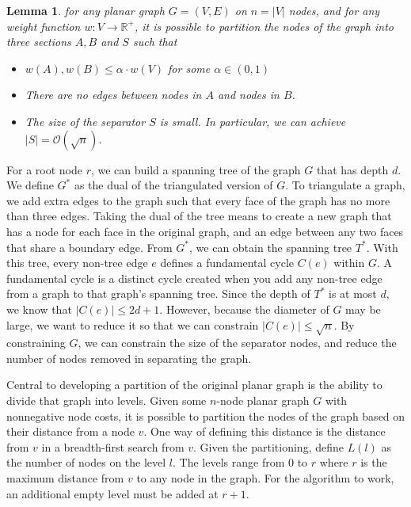 \documentclass[11pt]{article}
\newtheorem{lemma}[theorem]{Lemma}
\begin{document}
\begin{lemma}
    \label{lemma:separator}
    for any planar graph $G = (V,E)$ on $n = |V|$ nodes, and for any weight function $w: V \rightarrow \mathbb{R}^+$, it is possible to partition the nodes of the graph into three sections $A, B$ and $S$ such that
    \begin{itemize}
        \item $w(A), w(B) \leq \alpha \cdot w(V)$ for some $\alpha \in (0,1)$

        \item There are no edges between nodes in $A$ and nodes in $B$.

        \item The size of the separator $S$ is small. In particular, we can achieve $|S| = \mathcal{O}(\sqrt{n})$.
    \end{itemize}
\end{lemma}

For a root node $r$, we can build a spanning tree of the graph $G$ that has depth $d$. We define $G^*$ as the dual of the triangulated version of $G$. To triangulate a graph, we add extra edges to the graph such that every face of the graph has no more than three edges. Taking the dual of the tree means to create a new graph that has a node for each face in the original graph, and an edge between any two faces that share a boundary edge. From $G^*$, we can obtain the spanning tree $T^*$. With this tree, every non-tree edge $e$ defines a fundamental cycle $C(e)$ within $G$. A fundamental cycle is a distinct cycle created when you add any non-tree edge from a graph to that graph's spanning tree. Since the depth of $T^*$ is at most $d$, we know that $|C(e)| \leq 2d + 1$. However, because the diameter of $G$ may be large, we want to reduce it so that we can constrain $|C(e)| \leq \sqrt{n}$. By constraining $G$, we can constrain the size of the separator nodes, and reduce the number of nodes removed in separating the graph.

Central to developing a partition of the original planar graph is the ability to divide that graph into levels. Given some $n$-node planar graph $G$ with nonnegative node costs, it is possible to partition the nodes of the graph based on their distance from a node $v$. One way of defining this distance is the distance from $v$ in a breadth-first search from $v$. Given the partitioning, define $L(l)$ as the number of nodes on the level $l$. The levels range from $0$ to $r$ where $r$ is the maximum distance from $v$ to any node in the graph. For the algorithm to work, an additional empty level must be added at $r+1$.
\end{document}
